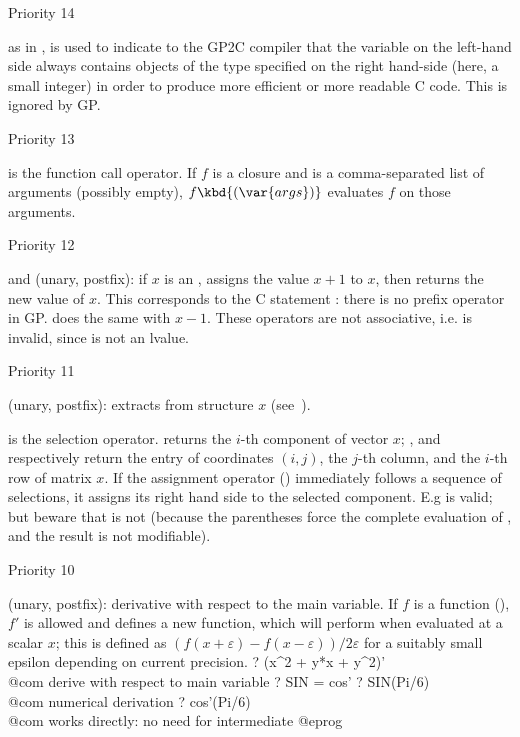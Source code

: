 \def\point#1{\noindent\item #1\hfill\break\indent\strut}
\point{Priority 14}
%
\kbd{:} as in , is used to indicate to the GP2C compiler that the
variable on the left-hand side always contains objects of the type specified
on the right hand-side (here, a small integer) in order to produce more
efficient or more readable C code. This is ignored by GP.

%
\point{Priority 13}
\kbd{( )} is the function call operator. If $f$ is a closure and 
is a comma-separated list of arguments (possibly empty),
$f\kbd{(\var{args})}$ evaluates $f$ on those arguments.

\point{Priority 12}
%
\kbd{++} and \kbd{--} (unary, postfix): if $x$ is an ,
 assigns the value $x+1$ to $x$, then returns the new value of
$x$. This corresponds to the C statement : there is no prefix
\kbd{++} operator in GP.  does the same with $x-1$. These
operators are not associative, i.e.  is invalid, since
 is not an lvalue.

\point{Priority 11}
%
 (unary, postfix):  extracts
 from structure $x$ (see~).

\kbd{[ ]} is the selection operator.  returns the $i$-th
component of vector $x$; ,  and
 respectively return the entry of coordinates $(i,j)$, the
$j$-th column, and the $i$-th row of matrix $x$. If the assignment operator
(\kbd{=}) immediately follows a sequence of selections, it assigns its right
hand side to the selected component. E.g  is valid; but
beware that  is not (because the parentheses force the
complete evaluation of , and the result is not modifiable).

\point{Priority 10}
%
 (unary, postfix): derivative with respect to the main variable.
If $f$ is a function (), $f'$ is allowed and defines a new
function, which will perform  when evaluated
at a scalar $x$; this is defined as $(f(x+\varepsilon) - f(x-\varepsilon)) /
2\varepsilon$ for a suitably small epsilon depending on current precision.
\bprog
? (x^2 + y*x + y^2)'  \\@com derive with respect to main variable 
? SIN = cos'
? SIN(Pi/6)         \\@com numerical derivation
? cos'(Pi/6)        \\@com works directly: no need for intermediate 
@eprog

